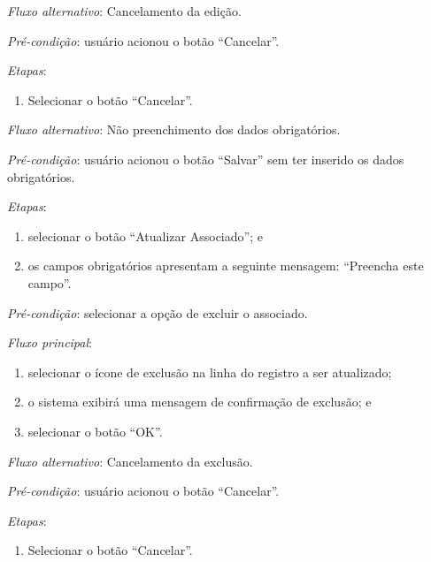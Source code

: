 \noindent \textit{Fluxo alternativo}: Cancelamento da edição.

\noindent \textit{Pré-condição}: usuário acionou o botão ``Cancelar''.

\noindent \textit{Etapas}:

\begin{enumerate}
    \item Selecionar o botão ``Cancelar''.
\end{enumerate}

\noindent \textit{Fluxo alternativo}: Não preenchimento dos dados obrigatórios.

\noindent \textit{Pré-condição}: usuário acionou o botão ``Salvar'' sem ter inserido os dados obrigatórios.

\noindent \textit{Etapas}:

\begin{enumerate}
    \item selecionar o botão ``Atualizar Associado''; e
    \item os campos obrigatórios apresentam a seguinte mensagem: ``Preencha este campo''.
\end{enumerate}



\vspace{0.7cm}

\noindent \textit{Pré-condição}: selecionar a opção de excluir o associado.

\noindent \textit{Fluxo principal}:

\begin{enumerate}
    \item selecionar o ícone de exclusão na linha do registro a ser atualizado;
    \item o sistema exibirá uma mensagem de confirmação de exclusão; e
    \item selecionar o botão ``OK''.
\end{enumerate}

\noindent \textit{Fluxo alternativo}: Cancelamento da exclusão.

\noindent \textit{Pré-condição}: usuário acionou o botão ``Cancelar''.

\noindent \textit{Etapas}:

\begin{enumerate}
    \item Selecionar o botão ``Cancelar''.
\end{enumerate}



